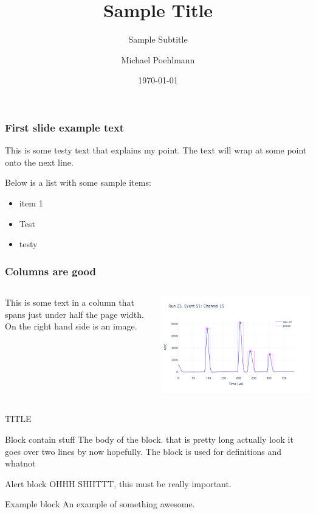 \documentclass[aspectratio=1610,t]{beamer}
\title{Sample Title}
\subtitle{Sample Subtitle}
\author{Michael Poehlmann}
\institute{UC Davis}
\date{\today}
\begin{document}
\begin{frame}
\titlepage
\end{frame}

\begin{frame}
	\frametitle{First slide example text}
	This is some testy text that explains my point. The text will wrap at some point onto the next line.

	Below is a list with some sample items:

	\begin{itemize}
		\item{item 1}
		\item{Test}
		\item{testy}
	\end{itemize}
\end{frame}

\begin{frame}
	\frametitle{Columns are good}
	\begin{columns}

		This is some text in a column that spans just under half the page width. On the right hand side is an image.

		\includegraphics[width=\textwidth]{figs/logo.png}
	\end{columns}
\end{frame}

\begin{frame}{TITLE}
	\begin{block}{Block contain stuff}
		The body of the block. that is pretty long actually look it goes over two lines by now hopefully. The block is used for definitions and whatnot
	\end{block}
	\begin{alertblock}{Alert block}
		OHHH SHIITTT, this must be really important.
	\end{alertblock}
	\begin{exampleblock}{Example block}
		An example of something awesome.
	\end{exampleblock}
\end{frame}
\end{document}
